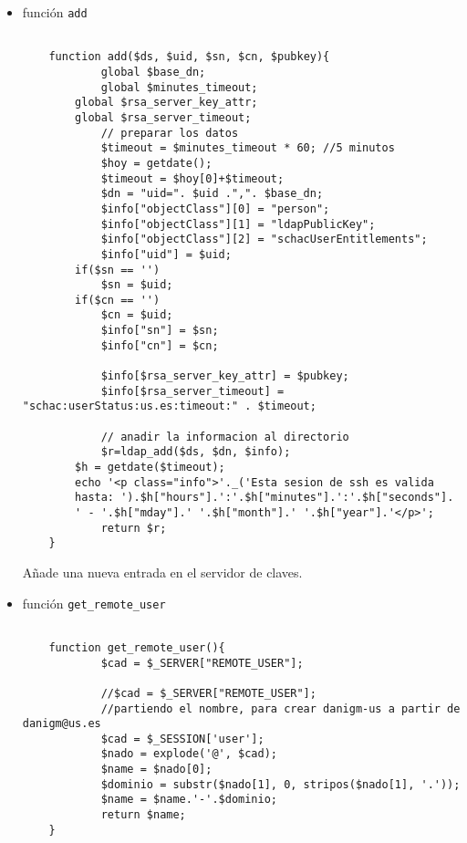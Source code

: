 \begin{itemize}
    \item función \texttt{add}

    \begin{lstlisting}

    function add($ds, $uid, $sn, $cn, $pubkey){
            global $base_dn;
            global $minutes_timeout;
        global $rsa_server_key_attr;
        global $rsa_server_timeout;
            // preparar los datos
            $timeout = $minutes_timeout * 60; //5 minutos
            $hoy = getdate();
            $timeout = $hoy[0]+$timeout;
            $dn = "uid=". $uid .",". $base_dn;
            $info["objectClass"][0] = "person";
            $info["objectClass"][1] = "ldapPublicKey";
            $info["objectClass"][2] = "schacUserEntitlements";
            $info["uid"] = $uid;
        if($sn == '')
            $sn = $uid;
        if($cn == '')
            $cn = $uid;
            $info["sn"] = $sn;
            $info["cn"] = $cn;

            $info[$rsa_server_key_attr] = $pubkey;
            $info[$rsa_server_timeout] = "schac:userStatus:us.es:timeout:" . $timeout;

            // anadir la informacion al directorio
            $r=ldap_add($ds, $dn, $info);
        $h = getdate($timeout);
        echo '<p class="info">'._('Esta sesion de ssh es valida
        hasta: ').$h["hours"].':'.$h["minutes"].':'.$h["seconds"].
        ' - '.$h["mday"].' '.$h["month"].' '.$h["year"].'</p>';
            return $r;
    }

    \end{lstlisting}

    Añade una nueva entrada en el servidor de claves.

    \item función \texttt{get\_remote\_user}

    \begin{lstlisting}

    function get_remote_user(){
            $cad = $_SERVER["REMOTE_USER"];

            //$cad = $_SERVER["REMOTE_USER"];
            //partiendo el nombre, para crear danigm-us a partir de danigm@us.es
            $cad = $_SESSION['user'];
            $nado = explode('@', $cad);
            $name = $nado[0];
            $dominio = substr($nado[1], 0, stripos($nado[1], '.'));
            $name = $name.'-'.$dominio;
            return $name;
    }

    \end{lstlisting}


\end{itemize}

